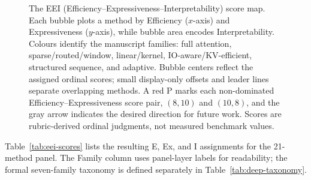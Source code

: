 \documentclass[10pt,twocolumn]{article}
\newif\ifshrinkfloats
\begin{document}
\begin{figure}[!p]
\resizebox{\ifshrinkfloats 0.50\textwidth\else 0.80\textwidth\fi}{!}{}
\caption{The EEI (Efficiency--Expressiveness--Interpretability) score map. Each bubble plots a method by Efficiency ($x$-axis) and Expressiveness ($y$-axis), while bubble area encodes Interpretability. Colours identify the manuscript families: full attention, sparse/routed/window, linear/kernel, IO-aware/KV-efficient, structured sequence, and adaptive. Bubble centers reflect the assigned ordinal scores; small display-only offsets and leader lines separate overlapping methods. A red P marks each non-dominated Efficiency--Expressiveness score pair, $(8,10)$ and $(10,8)$, and the gray arrow indicates the desired direction for future work. Scores are rubric-derived ordinal judgments, not measured benchmark values.}
\label{fig:eei-plot}

\end{figure}

Table~\ref{tab:eei-scores} lists the resulting E, Ex, and I assignments for the 21-method panel. The Family column uses panel-layer labels for readability; the formal seven-family taxonomy is defined separately in Table~\ref{tab:deep-taxonomy}.
\end{document}
